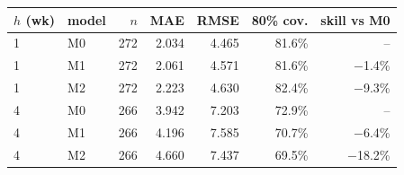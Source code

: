 \begin{tabular}{llrrrrr}
\toprule
$h$ (wk) & model & $n$ & MAE & RMSE & 80\% cov. & skill vs M0 \\
\midrule
  1 & M0 & 272 & 2.034 & 4.465 & 81.6\% & -- \\
  1 & M1 & 272 & 2.061 & 4.571 & 81.6\% & $-$1.4\% \\
  1 & M2 & 272 & 2.223 & 4.630 & 82.4\% & $-$9.3\% \\
  4 & M0 & 266 & 3.942 & 7.203 & 72.9\% & -- \\
  4 & M1 & 266 & 4.196 & 7.585 & 70.7\% & $-$6.4\% \\
  4 & M2 & 266 & 4.660 & 7.437 & 69.5\% & $-$18.2\% \\
\bottomrule
\end{tabular}

